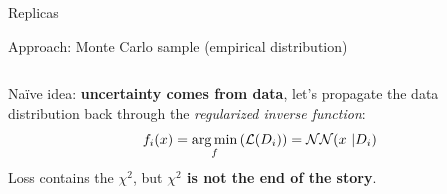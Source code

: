 \documentclass[9pt]{beamer}
\begin{document}
\begin{frame}{Replicas}
    \begin{center}
        \nnpdf{} Approach: Monte Carlo sample (empirical distribution)
    \end{center}
    \vspace*{10pt}

    \begin{columns}
        \begin{column}{0.4\textwidth}
            \vspace*{15pt}

            Na\"ive idea: \textbf{uncertainty comes from data}, let's propagate
            the data distribution back through the \textit{regularized inverse
            function}:
            \begin{equation*}
                f_i(x) =
                \argmin_f\left(\mathcal{L}(D_i)\right) = \mathcal{NN}(x\ | D_i)
            \end{equation*}
            {\footnotesize
                Loss contains the $\chi^2$, but \textbf{\alert{$\chi^2$ is not
                the end of the story}}.
            }
            \vspace*{10pt}


\end{column}
\end{columns}
\end{frame}
\end{document}

